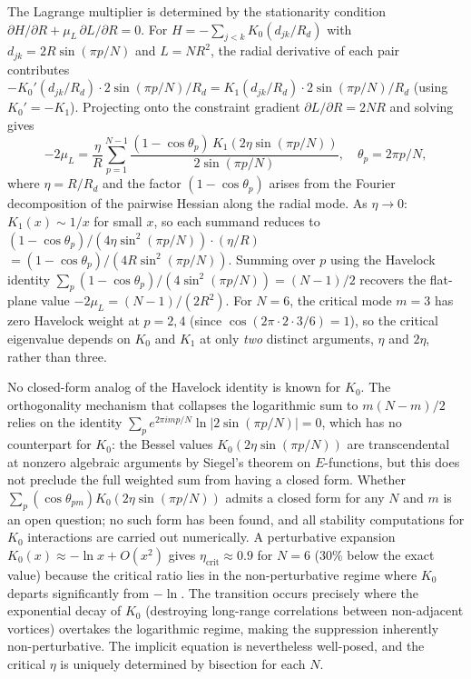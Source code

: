The Lagrange multiplier is determined by the stationarity condition
$\partial H/\partial R + \mu_L\,\partial L/\partial R = 0$.  For
$H = -\sum_{j<k}K_0(d_{jk}/R_d)$ with $d_{jk} = 2R\sin(\pi p/N)$
and $L = NR^2$, the radial derivative of each pair contributes
$-K_0'(d_{jk}/R_d)\cdot 2\sin(\pi p/N)/R_d
= K_1(d_{jk}/R_d)\cdot 2\sin(\pi p/N)/R_d$
(using $K_0' = -K_1$).  Projecting onto the constraint gradient
$\partial L/\partial R = 2NR$ and solving gives
\begin{equation}\label{eq:mu-k0}
  -2\mu_L = \frac{\eta}{R}\sum_{p=1}^{N-1}
  \frac{(1-\cos\theta_p)\,K_1(2\eta\sin(\pi p/N))}
       {2\sin(\pi p/N)},
  \quad \theta_p = 2\pi p/N,
\end{equation}
where $\eta = R/R_d$ and the factor $(1{-}\cos\theta_p)$ arises from
the Fourier decomposition of the pairwise Hessian along the radial
mode.  As $\eta \to 0$: $K_1(x) \sim 1/x$ for small $x$, so each
summand reduces to
$(1{-}\cos\theta_p)/(4\eta\sin^2(\pi p/N)) \cdot (\eta/R)$
$= (1{-}\cos\theta_p)/(4R\sin^2(\pi p/N))$.  Summing over $p$ using
the Havelock identity $\sum_p (1{-}\cos\theta_p)/(4\sin^2(\pi p/N))
= (N{-}1)/2$ recovers the flat-plane value $-2\mu_L = (N{-}1)/(2R^2)$.  For $N = 6$, the critical mode $m = 3$
has zero Havelock weight at $p = 2, 4$ (since
$\cos(2\pi \cdot 2 \cdot 3/6) = 1$), so the critical eigenvalue
depends on $K_0$ and $K_1$ at only \emph{two} distinct arguments,
$\eta$ and $2\eta$, rather than three.

No closed-form analog of the Havelock identity is known for $K_0$.
The orthogonality mechanism that collapses the logarithmic sum to
$m(N{-}m)/2$ relies on the identity $\sum_p e^{2\pi i mp/N}\ln
|2\sin(\pi p/N)| = 0$, which has no counterpart for $K_0$:
the Bessel values $K_0(2\eta\sin(\pi p/N))$ are transcendental at
nonzero algebraic arguments by Siegel's theorem on $E$-functions,
but this does not preclude the full weighted sum from having a
closed form.  Whether $\sum_p (\cos\theta_{pm})
K_0(2\eta\sin(\pi p/N))$ admits a closed form for any $N$ and $m$
is an open question; no such form has been found, and all stability
computations for $K_0$ interactions are carried out numerically.
A perturbative expansion
$K_0(x) \approx -\ln x + O(x^2)$ gives $\eta_{\mathrm{crit}} \approx
0.9$ for $N = 6$ (30\% below the exact value) because the critical
ratio lies in the non-perturbative regime where $K_0$ departs
significantly from $-\ln$.  The transition occurs precisely where the
exponential decay of $K_0$ (destroying long-range correlations between
non-adjacent vortices) overtakes the logarithmic regime, making the
suppression inherently non-perturbative.  The implicit equation is
nevertheless well-posed, and the critical $\eta$ is uniquely determined
by bisection for each $N$.

